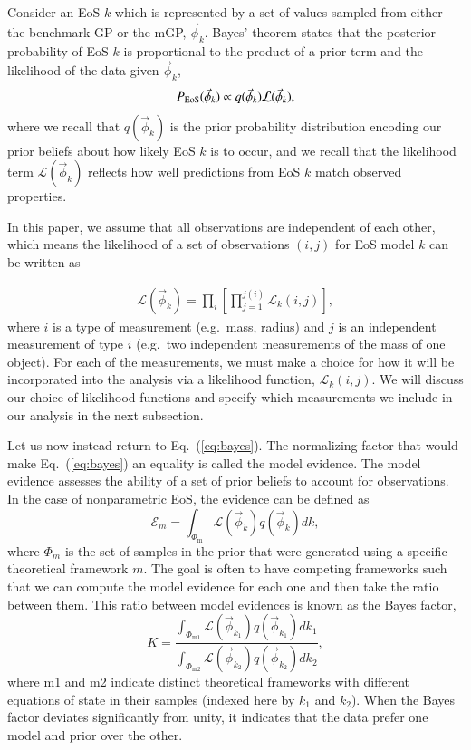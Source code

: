 \documentclass[aps,prd,nofootinbib,tightenlines,notitlepage,floatfix,superscriptaddress,showkeys,twocolumn]{revtex4-1}
\begin{document}
Consider an EoS $k$ which is represented by a set of values sampled from either the benchmark GP or the mGP, $\vec{\phi}_k$. Bayes' theorem states that the posterior probability of EoS $k$ is proportional to the product of a prior term and the likelihood of the data given $\vec{\phi}_k$, 
\begin{equation}\label{eq:bayes}
  P_{\rm EoS}(\vec{\phi}_k) \propto q(\vec{\phi}_k) \mathcal{L}(\vec{\phi}_k),
\end{equation} 
where we recall that $q(\vec{\phi}_k)$ is the prior probability distribution encoding our prior beliefs about how likely EoS $k$ is to occur, and we recall that the likelihood term $\mathcal{L}(\vec{\phi}_k)$ reflects how well predictions from EoS $k$ match observed properties. 

In this paper, we assume that all observations are independent of each other, which means the likelihood of a set of observations $(i,j)$ for EoS model $k$ can be written as

\begin{align}\label{eq:likelihood}
    \mathcal{L}(\vec{\phi}_k)= \prod_i \left [\prod_{j=1}^{j(i)} \mathcal{L}_k(i,j) \right ],
\end{align}
where $i$ is a type of measurement (e.g.~mass, radius) and $j$ is an independent measurement of type $i$ (e.g.~two independent measurements of the mass of one object). 
For each of the measurements, we must make a choice for how it will be incorporated into the analysis via a likelihood function, $\mathcal{L}_k(i,j)$. We will discuss our choice of likelihood functions and specify which measurements we include in our analysis in the next subsection.

Let us now instead return to Eq.\ (\ref{eq:bayes}). The normalizing factor that would make Eq.\ (\ref{eq:bayes}) an equality is called the model evidence. The model evidence assesses the ability of a set of prior beliefs to account for observations. In the case of nonparametric EoS, the evidence can be defined as
\begin{equation}\label{eq:evidence}
    \mathcal{E}_m = \int_{\Phi_\textrm{m}} \mathcal{L}(\vec{\phi}_k)q(\vec{\phi}_k) dk,
\end{equation}
where $\Phi_m$ is the set of samples in the prior that were generated using a specific theoretical framework $m$. The goal is often to have competing frameworks such that we can compute the model evidence for each one and then take the ratio between them. This ratio between model evidences is known as the Bayes factor, 
\begin{equation}
    K = \dfrac{\int_{\Phi_{\textrm{m}1}} \mathcal{L}(\vec{\phi}_{k_1})q(\vec{\phi}_{k_1}) dk_1}{\int_{\Phi_{\textrm{m}2}} \mathcal{L}(\vec{\phi}_{k_2})q(\vec{\phi}_{k_2}) dk_2},
\end{equation}
where m1 and m2 indicate distinct theoretical frameworks with different equations of state in their samples (indexed here by $k_1$ and $k_2$). When the Bayes factor deviates significantly from unity, it indicates that the data prefer one model and prior over the other. 
\end{document}
